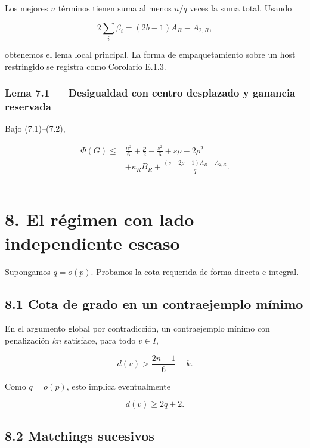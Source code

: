 \documentclass[
  spanish,
  11pt,
  a4paper,
]{article}
\begin{document}
Los mejores \(u\) términos tienen suma al menos \(u/q\) veces la suma total. Usando

\[
2\sum_i\beta_i
=(2b-1)A_R-A_{2,R},
\]

obtenemos el lema local principal. La forma de empaquetamiento sobre un host restringido se registra como Corolario E.1.3.

\subsubsection{Lema 7.1 --- Desigualdad con centro desplazado y ganancia reservada}\label{lema-7.1-desigualdad-con-centro-desplazado-y-ganancia-reservada}

Bajo (7.1)--(7.2),

\[
\boxed{
\begin{aligned}
\Phi(G)
\le{}&
\frac{n^2}{6}+\frac p2-\frac{s^2}{6}
+s\rho-2\rho^2\\
&+
\kappa_RB_R
+
\frac{(s-2\rho-1)A_R-A_{2,R}}q.
\end{aligned}
}
\tag{7.6}
\]

\begin{center}\rule{0.5\linewidth}{0.5pt}\end{center}

\section{8. El régimen con lado independiente escaso}\label{el-ruxe9gimen-con-lado-independiente-escaso}

Supongamos \(q=o(p)\). Probamos la cota requerida de forma directa e integral.

\subsection{8.1 Cota de grado en un contraejemplo mínimo}\label{cota-de-grado-en-un-contraejemplo-muxednimo}

En el argumento global por contradicción, un contraejemplo mínimo con penalización \(kn\) satisface, para todo \(v\in I\),

\[
d(v)>
\frac{2n-1}{6}+k.
\tag{8.1}
\]

Como \(q=o(p)\), esto implica eventualmente

\[
d(v)\ge2q+2.
\tag{8.2}
\]

\subsection{8.2 Matchings sucesivos}\label{matchings-sucesivos}
\end{document}
